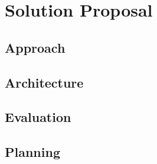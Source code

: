 \section{Solution Proposal}

\subsection{Approach}

\subsection{Architecture}

\subsection{Evaluation}

\subsection{Planning}